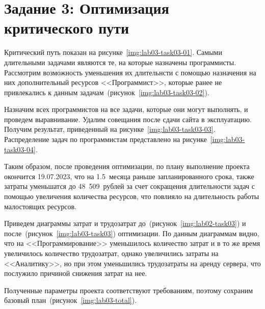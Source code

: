 \section{Задание 3: Оптимизация критического пути }

Критический путь показан на рисунке~\ref{img:lab03-task03-01}. Самыми
длительными задачами являются те, на которые назначены программисты. Рассмотрим
возможность уменьшения их длительнсти с помощью назначения на них
дополнительный ресурсов <<Программист>>, которые ранее не привлекались к данным
задачам~(рисунок~\ref{img:lab03-task03-02}).



Назначим всех программистов на все задачи, которые они могут выполнять, и
проведем выравнивание. Удалим совещания после сдачи сайта в эксплуатацию.
Получим результат, приведенный на рисунке~\ref{img:lab03-task03-03}.
Распределение задач по программистам представлено на
рисунке~\ref{img:lab03-task03-04}.



Таким образом, после проведения оптимизации, по плану выполнение проекта
окончится 19.07.2023, что на 1.5~месяца раньше запланированного срока, также
затраты уменьшатся до 48~509~рублей за счет сокращения длительности задач с
помощью увеличения количества ресурсов, что повлияло на длительность работы
малостоящих ресурсов.

Приведем диаграммы затрат и трудозатрат до~(рисунок~\ref{img:lab02-task03}) и
после~(рисунок~\ref{img:lab03-task03}) оптимизации.  По данным диаграммам
видно, что на <<Программирование>> уменьшилось количество затрат и в то же
время увеличилось количество трудозатрат, однако увеличились затраты на
<<Аналитику>>, но при этом уменьшились трудозатраты на аренду сервера, что
послужило причиной снижения затрат на нее.



Полученные параметры проекта соответствуют требованиям, поэтому сохраним
базовый план~(рисунок~\ref{img:lab03-total}).

